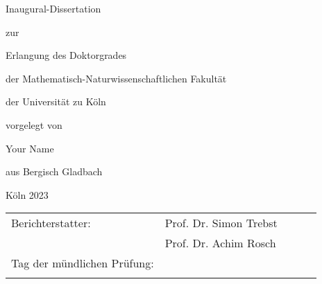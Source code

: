 \begin{titlepage}
\renewcommand{\footnotesize}{\small}
\renewcommand{\footnoterule}{\relax}

\thispagestyle{empty}
\renewcommand{\baselinestretch}{1} 
\begin{center}
	{\vspace*{1mm} \Huge {\color{maincolor2} } \par}
	{ \Large \vspace*{20mm} {\LARGE \mainsemibold Inaugural-Dissertation} \par \vspace*{4mm} zur \par \vspace*{4mm} Erlangung des Doktorgrades \par \vspace*{4mm} der Mathematisch-Naturwissenschaftlichen Fakultät \par \vspace*{4mm} der Universität zu Köln \par \vspace*{4mm} vorgelegt von \par  \vspace*{15mm}}
	{{\LARGE \mainsemibold Your Name} \par \vspace*{10mm}}
	{\large \vspace*{1ex} aus Bergisch Gladbach \par \vspace*{1ex}}
	{\large K\"oln 2023}
\end{center}
\end{titlepage}


\thispagestyle{empty}
\begin{center}
\setlength{\tabcolsep}{2em} %
\begin{tabular}{lllll}
	Berichterstatter:           & Prof. Dr. Simon Trebst &  &  &  \\[1em]
	& Prof. Dr. Achim Rosch  &  &  &  \\[2em]
	Tag der mündlichen Prüfung: &             &  &  &  \\
	&                        &  &  & 
\end{tabular}
\end{center}